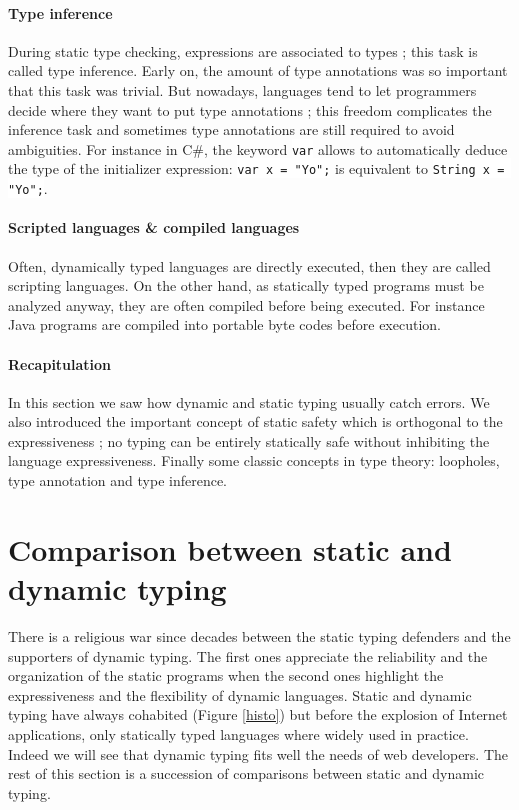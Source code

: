 \documentclass[a4paper]{report}
\newcommand{\icsharp}[1]{\colorbox{white}{\lstinline[language=code]&#1&}} %
\newcommand{\reffig}[1]{(Figure \ref{#1})}
\begin{document}
\paragraph{Type inference} During static type checking, expressions are associated to types ; this task is called type inference. Early on, the amount of type annotations was so important that this task was trivial. But nowadays, languages tend to let programmers decide where they want to put type annotations ; this freedom complicates the inference task and sometimes type annotations are still required to avoid ambiguities. For instance in C\#, the keyword \icsharp{var} allows to automatically deduce the type of the initializer expression: \icsharp{var x = "Yo";} is equivalent to \icsharp{String x = "Yo";}.

\paragraph{Scripted languages \& compiled languages} Often, dynamically typed languages are directly executed, then they are called scripting languages. On the other hand, as statically typed programs must be analyzed anyway, they are often compiled before being executed. For instance Java programs are compiled into portable byte codes before execution.

\paragraph{Recapitulation} In this section we saw how dynamic and static typing usually catch errors. We also introduced the important concept of static safety which is orthogonal to the expressiveness ; no typing can be entirely statically safe without inhibiting the language expressiveness. Finally some classic concepts in type theory: loopholes, type annotation and type inference.

\section{Comparison between static and dynamic typing}

There is a religious war since decades between the static typing defenders and the supporters of dynamic typing. The first ones appreciate the reliability and the organization of the static programs when the second ones highlight the expressiveness and the flexibility of dynamic languages. Static and dynamic typing have always cohabited \reffig{histo} but before the explosion of Internet applications, only statically typed languages where widely used in practice. Indeed we will see that dynamic typing fits well the needs of web developers. The rest of this section is a succession of comparisons between static and dynamic typing.
\end{document}
